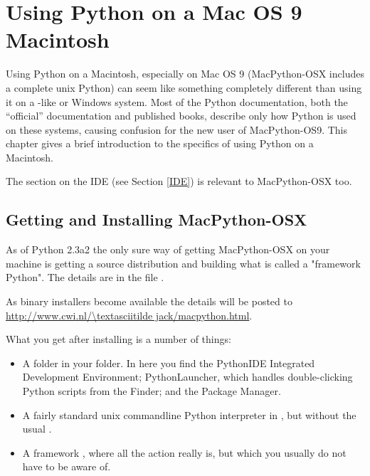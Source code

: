 \chapter{Using Python on a Mac OS 9 Macintosh \label{using}}

Using Python on a Macintosh, especially on Mac OS 9 (MacPython-OSX
includes a complete unix Python) can seem like something completely
different than using it on a \UNIX-like or Windows system. Most of the
Python documentation, both the ``official'' documentation and published
books, describe only how Python is used on these systems, causing
confusion for the new user of MacPython-OS9. This chapter gives a brief
introduction to the specifics of using Python on a Macintosh.


The section on the IDE (see Section \ref{IDE}) is relevant to MacPython-OSX
too.

\section{Getting and Installing MacPython-OSX \label{getting-OSX}}

As of Python 2.3a2 the only sure way of getting MacPython-OSX on your machine
is getting a source distribution and building what is called a "framework Python".
The details are in the file .

As binary installers become available the details will be posted to
\url{http://www.cwi.nl/\textasciitilde jack/macpython.html}.


What you get after installing is a number of things:

\begin{itemize}
    \item A  folder in your 
    folder. In here you find the PythonIDE Integrated Development Environment;
    PythonLauncher, which handles double-clicking Python scripts from the Finder; and
    the Package Manager.
    
    \item A fairly standard unix commandline Python interpreter in
    , but without the usual .
    
    \item A framework , where
    all the action really is, but which you usually do not have to be aware of.
\end{itemize}

